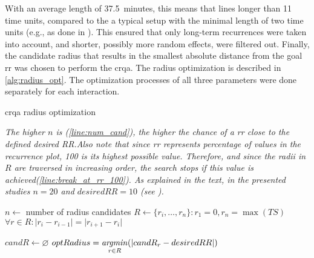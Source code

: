 With an average length of \SI{37.5}{minutes}, this means that lines longer than 11 time units, compared to the a typical setup with the minimal length of two time units (e.g., as done in \citet{Borrie2019syncing}).
This ensured that only long-term recurrences were taken into account, and shorter, possibly more random effects, were filtered out.
Finally, the candidate radius that results in the smallest absolute distance from the goal \ac{rr} was chosen to perform the \ac{crqa}.
The radius optimization is described in \cref{alg:radius_opt}.
The optimization processes of all three parameters were done separately for each interaction.
%
\begin{algorithm}[t]
	\addtocounter{myequations}{1}
	\setcounter{myequations}{13}
	\caption{\acs{crqa} radius optimization}
	\label{alg:radius_opt}
	\algorithmcaption
		{\emph{The higher $n$ is (\cref{line:num_cand}), the higher the chance of a \ac{rr} close to the defined \emph{desired RR}.Also note that since \ac{rr} represents percentage of values in the recurrence plot, 100 is its highest possible value.
		Therefore, and since the radii in $R$ are traversed in increasing order, the search stops if this value is achieved(\cref{line:break_at_rr_100}).
		As explained in the text, in the presented studies $n = 20$ and $desiredRR = 10$ (see \citet{Coco2014crqa-r}).}}
	\DontPrintSemicolon
	
	
	$n \gets$ number of radius candidates \label{line:num_cand}\;
	$R \gets \{r_i, \ldots, r_n\} : r_1 = 0, r_n = \max(TS)$\;
	$\forall r \in R : \lvert r_i - r_{i-1} \rvert = \lvert r_{i+1} - r_i \rvert$ 
	
	$candR \gets \varnothing$\;
	$optRadius = \displaystyle\operatorname*{\mathit{argmin}}_{r \in R}(\lvert candR_r - desiredRR \rvert)$\;
\end{algorithm}

